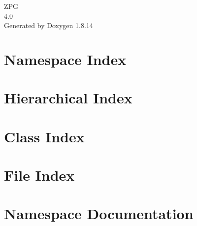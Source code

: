 \documentclass[twoside]{book}
\newcommand{\+}{\discretionary{\mbox{\scriptsize$\hookleftarrow$}}{}{}}
\newcommand{\clearemptydoublepage}{%
  \newpage{\pagestyle{empty}\cleardoublepage}%
}
\begin{document}
\hypersetup{pageanchor=false,
             bookmarksnumbered=true,
             pdfencoding=unicode
            }
\begin{titlepage}
\vspace*{7cm}
\begin{center}%
{\Large Z\+PG \\[1ex]\large 4.\+0 }\\
\vspace*{1cm}
{\large Generated by Doxygen 1.8.14}\\
\end{center}
\end{titlepage}
\clearemptydoublepage
{}
\tableofcontents
\clearemptydoublepage
{}
\hypersetup{pageanchor=true}

\chapter{Namespace Index}

\chapter{Hierarchical Index}

\chapter{Class Index}

\chapter{File Index}

\chapter{Namespace Documentation}












\end{document}
